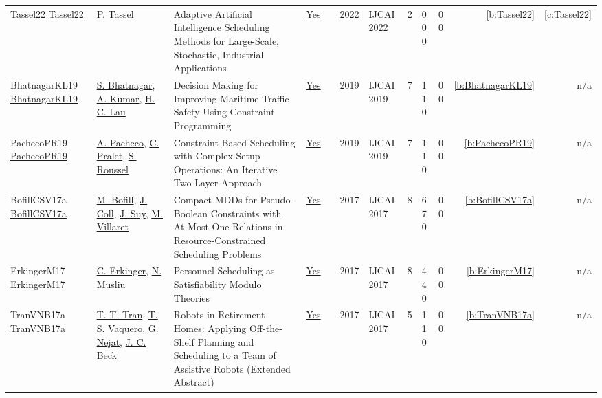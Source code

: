 {\begin{longtable}{>{\raggedright\arraybackslash}p{3cm}>{\raggedright\arraybackslash}p{4.5cm}>{\raggedright\arraybackslash}p{6.0cm}rrrp{2.5cm}rp{1cm}p{1cm}rr}
Tassel22 \href{https://doi.org/10.24963/ijcai.2022/841}{Tassel22} & \hyperref[auth:a58]{P. Tassel} & Adaptive Artificial Intelligence Scheduling Methods for Large-Scale, Stochastic, Industrial Applications & \href{../works/Tassel22.pdf}{Yes} & \cite{Tassel22} & 2022 & IJCAI 2022 & 2 & 0 0 0 & 0 0 & \ref{b:Tassel22} & \ref{c:Tassel22}\\
BhatnagarKL19 \href{https://doi.org/10.24963/ijcai.2019/803}{BhatnagarKL19} & \hyperref[auth:a1452]{S. Bhatnagar}, \hyperref[auth:a1360]{A. Kumar}, \hyperref[auth:a364]{H. C. Lau} & Decision Making for Improving Maritime Traffic Safety Using Constraint Programming & \href{../works/BhatnagarKL19.pdf}{Yes} & \cite{BhatnagarKL19} & 2019 & IJCAI 2019 & 7 & 1 1 0 & 0 0 & \ref{b:BhatnagarKL19} & n/a\\
PachecoPR19 \href{https://doi.org/10.24963/ijcai.2019/161}{PachecoPR19} & \hyperref[auth:a1451]{A. Pacheco}, \hyperref[auth:a21]{C. Pralet}, \hyperref[auth:a22]{S. Roussel} & Constraint-Based Scheduling with Complex Setup Operations: An Iterative Two-Layer Approach & \href{../works/PachecoPR19.pdf}{Yes} & \cite{PachecoPR19} & 2019 & IJCAI 2019 & 7 & 1 1 0 & 0 0 & \ref{b:PachecoPR19} & n/a\\
BofillCSV17a \href{https://doi.org/10.24963/ijcai.2017/78}{BofillCSV17a} & \hyperref[auth:a228]{M. Bofill}, \hyperref[auth:a1449]{J. Coll}, \hyperref[auth:a232]{J. Suy}, \hyperref[auth:a233]{M. Villaret} & Compact MDDs for Pseudo-Boolean Constraints with At-Most-One Relations in Resource-Constrained Scheduling Problems & \href{../works/BofillCSV17a.pdf}{Yes} & \cite{BofillCSV17a} & 2017 & IJCAI 2017 & 8 & 6 7 0 & 0 0 & \ref{b:BofillCSV17a} & n/a\\
ErkingerM17 \href{https://doi.org/10.24963/ijcai.2017/86}{ErkingerM17} & \hyperref[auth:a1450]{C. Erkinger}, \hyperref[auth:a45]{N. Musliu} & Personnel Scheduling as Satisfiability Modulo Theories & \href{../works/ErkingerM17.pdf}{Yes} & \cite{ErkingerM17} & 2017 & IJCAI 2017 & 8 & 4 4 0 & 0 0 & \ref{b:ErkingerM17} & n/a\\
TranVNB17a \href{https://doi.org/10.24963/ijcai.2017/726}{TranVNB17a} & \hyperref[auth:a799]{T. T. Tran}, \hyperref[auth:a804]{T. S. Vaquero}, \hyperref[auth:a204]{G. Nejat}, \hyperref[auth:a89]{J. C. Beck} & Robots in Retirement Homes: Applying Off-the-Shelf Planning and Scheduling to a Team of Assistive Robots (Extended Abstract) & \href{../works/TranVNB17a.pdf}{Yes} & \cite{TranVNB17a} & 2017 & IJCAI 2017 & 5 & 1 1 0 & 0 0 & \ref{b:TranVNB17a} & n/a\\

\end{longtable}}
